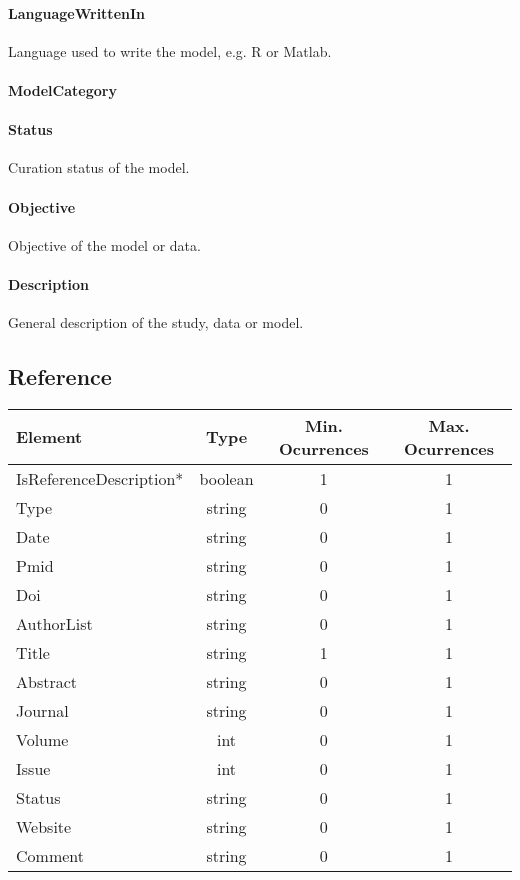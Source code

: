 \documentclass[a4paper]{report}
\begin{document}
\paragraph{LanguageWrittenIn}
Language used to write the model, e.g. R or Matlab.

\paragraph{ModelCategory}

\paragraph{Status}
Curation status of the model.

\paragraph{Objective}
Objective of the model or data.

\paragraph{Description}
General description of the study, data or model.

\subsection{Reference}

\begin{tabular}{|l|c|c|c|}
    \hline
    \textbf{Element} & \textbf{Type} & \textbf{Min. Ocurrences} & \textbf{Max. Ocurrences} \\
    \hline
    IsReferenceDescription* & boolean & 1 & 1 \\
    Type & string & 0 & 1 \\
    Date & string & 0 & 1 \\
    Pmid & string & 0 & 1 \\
    Doi & string & 0 & 1 \\
    AuthorList & string & 0 & 1\\
    Title & string & 1 & 1\\
    Abstract & string & 0 & 1 \\
    Journal & string & 0 & 1\\
    Volume & int & 0 & 1 \\
    Issue & int & 0 & 1 \\
    Status & string & 0 & 1 \\
    Website & string & 0 & 1 \\
    Comment & string & 0 & 1 \\
    \hline
\end{tabular}
\end{document}
